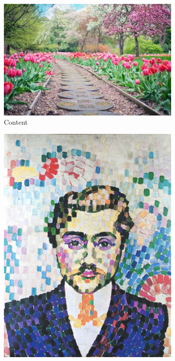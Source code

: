 \documentclass[10pt,twocolumn,letterpaper]{article}
\begin{document}
\begin{figure}[ht]
\centering
\begin{subfigure}[b]{0.38\linewidth}
  \centering
  \includegraphics[width=\linewidth]{imgs/flowers.jpg}
  \caption{Content}
\end{subfigure}
\quad
\begin{subfigure}[b]{0.19\linewidth}
  \centering
  \includegraphics[width=\linewidth]{imgs/delaunay.jpg}

\end{subfigure}
\end{figure}
\end{document}
